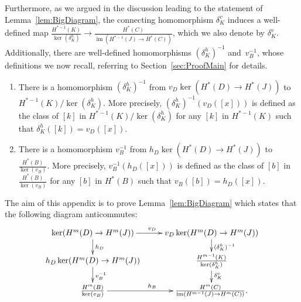 \documentclass[11pt,a4paper]{amsart}
\theoremstyle{definition}
\newcommand{\im}{\operatorname{im}}
\begin{document}
Furthermore, as we argued in the discussion leading to the statement of Lemma~\ref{lem:BigDiagram}, the connecting homomorphism $\delta_K^v$ induces a well-defined map $\frac{ H^{*-1}(K)}{\ker(\delta_K^h)} \to \frac{H^*(C)}{\im( H^{*-1}(J) \to  H^*(C))}$, which we also denote by $\delta_K^v$. Additionally, there are well-defined homomorphisms $(\delta_K^h)^{-1}$ and~$v_B^{-1}$, whose definitions we now recall, referring to Section~\ref{sec:ProofMain} for details.
\begin{enumerate}
\item There is a homomorphism $(\delta_K^h)^{-1}$ from $v_D \ker( H^*(D)  \to H^*(J))$ to $ H^{*-1}(K)/\ker(\delta_K^h)$. More precisely, $(\delta_K^h)^{-1}(v_D([x]))$ is defined as the class of $[k]$ in $H^{*-1}(K)/\ker(\delta_K^h)$ for any $[k]$ in $H^{*-1}(K)$ such that $\delta_K^h([k])=v_D([x])$.
\item There is a homomorphism $v_B^{-1}$ from  $h_D \ker(  H^*(D) \to H^*(J))$ to $\frac{ H^*(B)}{\ker(v_B)}$. More precisely, $v_B^{-1}(h_D([x]))$ is defined as the class of $[b]$ in $\frac{H^*(B)}{\ker(v_B)}$ for any $[b]$ in $H^*(B)$ such that $v_B([b])=h_D([x])$.
\end{enumerate}
The aim of this appendix is to prove Lemma~\ref{lem:BigDiagram} which states that the following diagram anticommutes:
\begin{equation}
\label{eq:9Lemma}
 \xymatrix@R0.5cm{
\ker(  H^m(D)  \to  H^m(J)) \ar[r]^{  v_D}\ar[d]^{h_D} & v_D \ker(  H^m(D)  \to  H^m(J)) \ar[d]^{(\delta_K^h)^{-1}}\\
h_D \ker(  H^m(D)  \to  H^m(J))\ar[d]^{v_B^{-1}} & \frac{H^{m-1}(K)}{\ker(\delta_K^h)}\ar[d]^{\delta_K^v} \\
\frac{ H^m(B)}{\ker(v_B)} \ar[r]^{h_B}& \frac{ H^m(C)}{\im(H^{m-1}(J) \to  H^m(C))}.
}
\end{equation}
\end{document}
